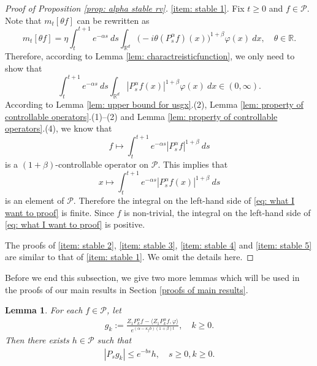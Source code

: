\documentclass[12pt,a4paper]{amsart}
\theoremstyle{plain}
\newtheorem{lem}[thm]{Lemma}
\theoremstyle{definition}
\numberwithin{equation}{section}
\begin{document}
\begin{proof}[Proof of Proposition \ref{prop: alpha stable rv}]
    \eqref{item: stable 1}.
	Fix $t\geq 0$ and $f\in \mathcal P$.
	Note that $m_t[\theta f]$ can be rewritten as
\[
    m_t[\theta f]
       = \eta \int_t^{t+1}e^{-\alpha s}~ds\int_{\mathbb R^d} \big(-i\theta (P_{s}^\alpha f)(x)\big)^{1+\beta} \varphi(x)~dx,
    \quad \theta \in \mathbb R.
\]
	Therefore, according to Lemma \ref{lem: charactreisticfunction}, we only need to show that
\begin{equation}
\label{eq: what I want to proof}
	 \int_t^{t+1}e^{-\alpha s}~ds\int_{\mathbb R^d} | P_{s}^\alpha f(x)|^{1+\beta} \varphi(x)~dx
	\in (0, \infty).
\end{equation}
	According to Lemma \ref{lem: upper bound for usgx}.(2), Lemma \ref{lem: property of controllable operators}.(1)--(2) and Lemma \ref{lem: property of controllable operators}.(4),
      we know that 
      \[ 
      f \mapsto \int_t^{t+1}e^{-\alpha s} |P_{s}^\alpha f|^{1+\beta}~ds
      \] 
      is a $(1+\beta)$-controllable operator on $\mathcal P$.
	    This implies that \[ x \mapsto \int_t^{t+1}e^{-\alpha s} |P_{s}^\alpha f(x)|^{1+\beta}~ds\] is an element of $\mathcal P$.
	Therefore the integral on the left-hand side of \eqref{eq: what I want to proof} is finite.
	Since $f$ is non-trivial, 
    the integral on the left-hand side of \eqref{eq: what I want to proof} is positive.

The proofs of \eqref{item: stable 2}, \eqref{item: stable 3}, \eqref{item: stable 4} and \eqref{item: stable 5} are similar to that of \eqref{item: stable 1}. We omit the details here.
\end{proof}

 Before we end this subsection, we  give  two more lemmas which will be used in the proofs of our main results in Section \ref{proofs of main results}.

\begin{lem}{\cite[Lemma 2.8]{MarksMilos2018CLT}}\label{lem: control of gk}
    For each $f\in \mathcal{P}$, let
\begin{align}
    g_k
    := \frac{Z_1 P^{\alpha}_k f-\langle  Z_1P^{\alpha}_k f,\varphi\rangle}{e^{(\alpha-\kappa_f b)(1+\beta)t}},
    \quad k \geq 0.
\end{align}
    Then there exists $h\in \mathcal{P}$ such that
\begin{align}
    |P_sg_k|\leq e^{-bs}h,\quad s\geq 0, k \geq 0.
\end{align}
\end{lem}
\end{document}
